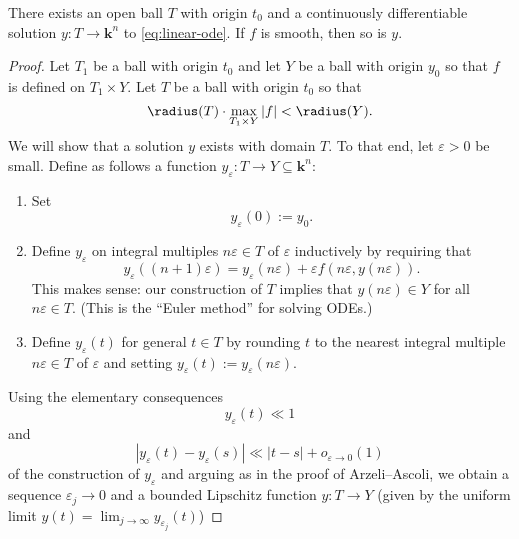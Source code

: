 \documentclass[reqno]{amsart} 
\def\eps{\varepsilon}
\begin{document}
\begin{theorem}[Existence]\label{thm:existence}
  There exists an open ball $T$ with origin $t_0$ and a continuously
  differentiable solution $y : T \rightarrow \mathbf{k}^n$ to
  \eqref{eq:linear-ode}.  If $f$ is smooth, then so is $y$.
\end{theorem}
\begin{proof}
  Let $T_1$ be a ball with origin $t_0$
  and let $Y$ be a ball with origin $y_0$
  so that $f$ is defined on
  $T_1 \times Y$.
  Let $T$ be a ball with origin $t_0$
  so that
  \begin{equation*}
  \radius(T) \cdot \max_{T_1 \times Y} |f| < \radius(Y).
  \end{equation*}
  We will show that a solution $y$ exists with domain $T$.  To
  that end, let $\eps > 0$ be small.  Define as follows a
  function $y_\eps : T \rightarrow Y \subseteq \mathbf{k}^n$:
  \begin{enumerate}
  \item Set
    \begin{equation}\label{eq:diff-eqn-euler-initial-cond}
      y_\eps(0) := y_0.
    \end{equation}
  \item Define $y_\eps$ on integral multiples $n \eps \in T$ of
    $\eps$ 
    inductively
    by requiring that
    \begin{equation}\label{eq:diff-eqn-euler-initial-step}
    y_\eps((n+1) \eps)
    = y_\eps(n \eps) + \eps f(n \eps, y(n \eps)).
  \end{equation}
  This makes sense: our construction of $T$
    implies that $y(n \eps) \in Y$ for all $n \eps \in T$.
    (This is the ``Euler method'' for solving ODEs.)
  \item
    Define $y_\eps(t)$ for general $t \in T$
    by rounding $t$ to the nearest integral multiple
    $n \eps \in T$ of $\eps$
    and setting $y_\eps(t) := y_\eps(n \eps)$.
  \end{enumerate}
  Using the elementary consequences
  \begin{equation*}
  y_\eps(t) \ll 1
  \end{equation*}
  and
  \begin{equation*}
  |y_\eps(t) - y_\eps(s)| \ll |t - s| + o_{\eps \rightarrow 0}(1)
  \end{equation*}
  of the construction of $y_\eps$
  and arguing as in the proof of Arzeli--Ascoli,
  we obtain a
  sequence $\eps_j \rightarrow 0$
  and a
  bounded Lipschitz function $y : T \rightarrow Y$
  (given by the uniform limit $y(t) = \lim_{j \rightarrow \infty} y_{\eps_j}(t)$)

\end{proof}
\end{document}
